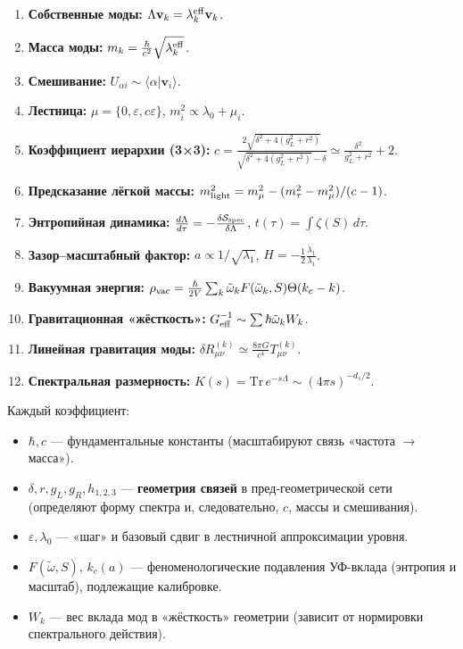 \documentclass[12pt,a4paper]{article}
\begin{document}
\begin{enumerate}
    \item \textbf{Собственные моды:} \(\Lambda \mathbf{v}_k = \lambda_k^{\rm eff} \mathbf{v}_k\).
    \item \textbf{Масса моды:} \(m_k = \frac{\hbar}{c^2} \sqrt{\lambda_k^{\rm eff}}\).
    \item \textbf{Смешивание:} \(U_{\alpha i} \sim \langle \alpha | \mathbf{v}_i \rangle\).
    \item \textbf{Лестница:} \(\mu = \{0, \varepsilon, c \varepsilon \}\), \(m_i^2 \propto \lambda_0 + \mu_i\).
    \item \textbf{Коэффициент иерархии (3×3):} \(c = \frac{2 \sqrt{\delta^2 + 4(g_L^2 + r^2)}}{\sqrt{\delta^2 + 4(g_L^2 + r^2)} - \delta} \simeq \frac{\delta^2}{g_L^2 + r^2} + 2\).
    \item \textbf{Предсказание лёгкой массы:} \(m_{\rm light}^2 = m_\mu^2 - (m_\tau^2 - m_\mu^2)/(c - 1)\).
    \item \textbf{Энтропийная динамика:} \(\frac{d \Lambda}{d \tau} = -\frac{\delta \mathcal{S}_{\rm spec}}{\delta \Lambda}\), \(t(\tau) = \int \zeta(S) \, d\tau\).
    \item \textbf{Зазор–масштабный фактор:} \(a \propto 1/\sqrt{\lambda_1}\), \(H = -\frac{1}{2} \frac{\dot{\lambda}_1}{\lambda_1}\).
    \item \textbf{Вакуумная энергия:} \(\rho_{\rm vac} = \frac{\hbar}{2 V} \sum_k \tilde{\omega}_k F(\tilde{\omega}_k, S) \Theta(k_c - k)\).
    \item \textbf{Гравитационная «жёсткость»:} \(G_{\rm eff}^{-1} \sim \sum \hbar \tilde{\omega}_k W_k\).
    \item \textbf{Линейная гравитация моды:} \(\delta R_{\mu\nu}^{(k)} \simeq \frac{8 \pi G}{c^4} T_{\mu\nu}^{(k)}\).
    \item \textbf{Спектральная размерность:} \(K(s) = \mathrm{Tr} \, e^{-s \Lambda} \sim (4 \pi s)^{-d_s/2}\).
\end{enumerate}

Каждый коэффициент:
\begin{itemize}
    \item \(\hbar, c\) — фундаментальные константы (масштабируют связь «частота \(\to\) масса»).
    \item \(\delta, r, g_L, g_R, h_{1,2,3}\) — \textbf{геометрия связей} в пред-геометрической сети (определяют форму спектра и, следовательно, \(c\), массы и смешивания).
    \item \(\varepsilon, \lambda_0\) — «шаг» и базовый сдвиг в лестничной аппроксимации уровня.
    \item \(F(\tilde{\omega}, S)\), \(k_c(a)\) — феноменологические подавления УФ-вклада (энтропия и масштаб), подлежащие калибровке.
    \item \(W_k\) — вес вклада мод в «жёсткость» геометрии (зависит от нормировки спектрального действия).
\end{itemize}
\end{document}
